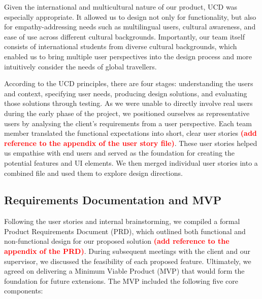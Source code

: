Given the international and multicultural nature of our product, UCD was especially appropriate. It allowed us to design not only for functionality, but also for empathy-addressing needs such as multilingual users, cultural awareness, and ease of use across different cultural backgrounds. Importantly, our team itself consists of international students from diverse cultural backgrounds, which enabled us to bring multiple user perspectives into the design process and more intuitively consider the needs of global travellers.

According to the UCD principles, there are four stages: understanding the users and context, specifying user needs, producing design solutions, and evaluating those solutions through testing. As we were unable to directly involve real users during the early phase of the project, we positioned ourselves as representative users by analysing the client's requirements from a user perspective. Each team member translated the functional expectations into short, clear user stories \textbf{\textcolor{red}{(add reference to the appendix of the user story file)}}. These user stories helped us empathise with end users and served as the foundation for creating the potential features and UI elements. We then merged individual user stories into a combined file and used them to explore design directions.

\subsection{Requirements Documentation and MVP}
Following the user stories and internal brainstorming, we compiled a formal Product Requirements Document (PRD), which outlined both functional and non-functional design for our proposed solution \textbf{\textcolor{red}{(add reference to the appendix of the PRD)}}. During subsequent meetings with the client and our supervisor, we discussed the feasibility of each proposed feature. Ultimately, we agreed on delivering a Minimum Viable Product (MVP) that would form the foundation for future extensions. The MVP included the following five core components:

